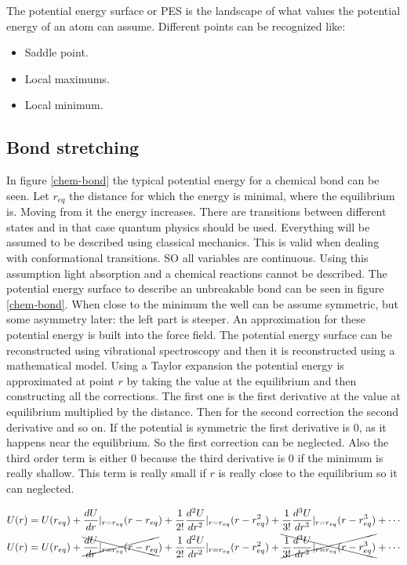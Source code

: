 The potential energy surface or PES is the landscape of what values the potential energy of an atom can assume.
Different points can be recognized like:

\begin{multicols}{2}
	\begin{itemize}
		\item Saddle point.
		\item Local maximums.
		\item Local minimum.
	\end{itemize}
\end{multicols}

	\subsection{Bond stretching}
	In figure \ref{chem-bond} the typical potential energy for a chemical bond can be seen.
	Let $r_{eq}$ the distance for which the energy is minimal, where the equilibrium is.
	Moving from it the energy increases.
	There are transitions between different states and in that case quantum physics should be used.
	Everything will be assumed to be described using classical mechanics.
	This is valid when dealing with conformational transitions.
	SO all variables are continuous.
	Using this assumption light absorption and a chemical reactions cannot be described.
	The potential energy surface to describe an unbreakable bond can be seen in figure \ref{chem-bond}.
	When close to the minimum the well can be assume symmetric, but some asymmetry later: the left part is steeper.
	An approximation for these potential energy is built into the force field.
	The potential energy surface can be reconstructed using vibrational spectroscopy and then it is reconstructed using a mathematical model.
	Using a Taylor expansion the potential energy is approximated at point $r$ by taking the value at the equilibrium and then constructing all the corrections.
	The first one is the first derivative at the value at equilibrium multiplied by the distance.
	Then for the second correction the second derivative and so on.
	If the potential is symmetric the first derivative is $0$, as it happens near the equilibrium.
	So the first correction can be neglected.
	Also the third order term is either $0$ because the third derivative is $0$ if the minimum is really shallow.
	This term is really small if $r$ is really close to the equilibrium so it can neglected.

	\begin{align*}
		U(r)&=U(r_{eq}) + \frac{dU}{dr}|_{r=r_{eq}}(r-r_{eq})+\frac{1}{2!}\frac{d^2U}{dr^2}|_{r=r_{eq}}(r-r_{eq}^2)+\frac{1}{3!}\frac{d^3U}{dr^3}|_{r=r_{eq}}(r-r_{eq}^3)+\cdots\\
		U(r)&=U(r_{eq}) + \xcancel{\frac{dU}{dr}|_{r=r_{eq}}(r-r_{eq}})+\frac{1}{2!}\frac{d^2U}{dr^2}|_{r=r_{eq}}(r-r_{eq}^2)+\xcancel{\frac{1}{3!}\frac{d^3U}{dr^3}|_{r=r_{eq}}(r-r_{eq}^3)}+\cdots\\
	\end{align*}

